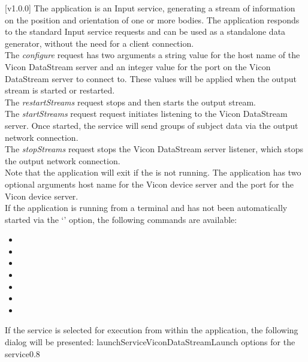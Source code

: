 [v1.0.0]
The  application is an Input service,
generating a stream of information on the position and orientation of one or more bodies.
The application responds to the standard Input service requests and can be used as a
standalone data generator, without the need for a client connection.\\

The \emph{configure} request has two arguments \longDash{} a string value for the host
name of the Vicon DataStream server and an integer value for the port on the Vicon
DataStream server to connect to.
These values will be applied when the output stream is started or restarted.\\ 

The \emph{restartStreams} request stops and then starts the output stream.\\

The \emph{startStreams} request request initiates listening to the Vicon DataStream
server.
Once started, the service will send groups of subject data via the output \yarp{} network
connection.\\

The \emph{stopStreams} request stops the Vicon DataStream server listener, which stops the
output \yarp{} network connection.\\ 

Note that the application will exit if the \emph{\RS} is not running.
The application has two optional arguments \longDash{} host name for the Vicon device
server and the port for the Vicon device server.
\insertAppParameters
\insertTagDescription{\VDSI}
\insertInputServiceComment\\

If the application is running from a terminal and has not been automatically started via
the `' option, the following commands are available:
\begin{itemize}
\item{}
\item\exSp{}
\item\exSp{}
\item\exSp{}
\item\exSp{}
\item\exSp{}
\item\exSp{}
\end{itemize}
\secondaryEnd
\condPage
{}
If the service is selected for execution from within the \emph{\CMU} application, the
following dialog will be presented:
%
{launchServiceViconDataStream}{Launch options for the \emph{\VDSI} service}{0.8}

